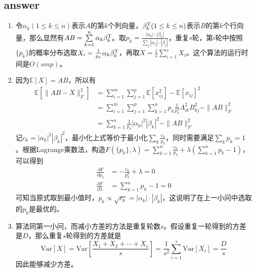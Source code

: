 \documentclass[12pt]{article}
\begin{document}
\subsection*{answer}
\begin{enumerate}
	\item 令$\alpha_k(1 \le k \le n)$表示$A$的第$k$个列向量，$\beta_k^{\text T}(1 \le k \le n)$表示$B$的第$k$个行向量，那么显然有$AB = \sum\limits_{k=1}^{n}\alpha_k\beta_k^{\text T}$。取$p_k = \frac{|\alpha_k|\cdot|\beta_k|}{\sum_j |\alpha_j|\cdot|\beta_j|}$，重复$s$轮，第$i$轮中按照$\{p_k\}$的概率分布选取$X_i = \frac{1}{p_k}\alpha_k\beta_k^{\text T}$，再取$X = \frac{1}{s}\sum\limits_{i=1}^sX_i$。这个算法的运行时间是$O(smp)$。
	\item 因为$\mathbb E[X] = AB$，所以有\begin{equation}
	\begin{split}
	\mathbb E[\|AB - X\|_F^2] &= \sum_{i=1}^{m}\sum_{j=1}^{p}\mathbb E[x_{ij}^2] - \mathbb E[x_{ij}]^2\\
	&= \sum_{i=1}^{m}\sum_{j=1}^{p}\sum_{k=1}^{n}p_k\frac{1}{p_k^2}A_{ik}^2B_{kj}^2  - \|AB\|_F^2\\
	&= \sum_{k=1}^{n}\frac{1}{p_k}|\alpha_k|^2|\beta_k|^2 - \|AB\|_F^2
	\end{split}
	\end{equation}
	记$c_k = |\alpha_k|^2|\beta_k|^2$，最小化上式等价于最小化$\sum_k \frac{c_k}{p_k}$，同时需要满足$\sum_k p_k = 1$。根据Lagrange乘数法，构造$F(\{p_k\}, \lambda) = \sum\limits_{k=1}^{n}\frac{c_k}{p_k} + \lambda\left(\sum\limits_{k=1}^{n}p_k - 1\right)$，可以得到
	\begin{align}
		\frac{\partial F}{\partial p_k} &= -\frac{c_k}{p_k^2} + \lambda = 0\\
		\frac{\partial F}{\partial \lambda} &= \sum_{k=1}^{n}p_k - 1 = 0
	\end{align}
	可知当原式取到最小值时，$p_k \propto \sqrt{c_k} = |\alpha_k| \cdot |\beta_k|$，这说明了在上一小问中选取的$p_k$是最优的。
	\item 算法同第一小问，而减小方差的方法是重复轮数$s$。假设重复一轮得到的方差是$D$，那么重复$s$轮得到的方差就是\begin{equation}
	\text{Var}[X] = \text{Var}\left[\frac{X_1 + X_2 + \cdots + X_s}{s}\right] = \frac{1}{s^2}\sum_{i=1}^{s}\text{Var}[X_i] = \frac{D}{s}
	\end{equation}
	因此能够减少方差。
\end{enumerate}
\end{document}

